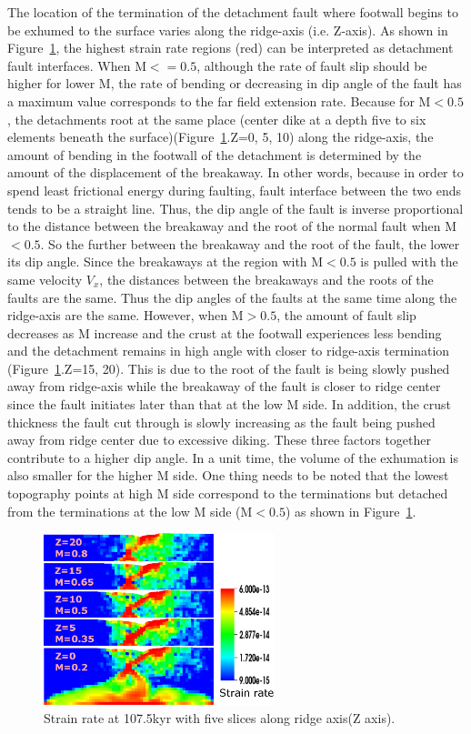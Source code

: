 The location of the termination of the detachment fault where footwall begins to be exhumed to the surface varies along the ridge-axis (i.e. Z-axis). As shown in Figure~\ref{fig_Results1_2}, the highest strain rate regions (red) can be interpreted as detachment fault interfaces. When M$<=0.5$, although the rate of fault slip should be higher for lower M, the rate of bending or decreasing in dip angle of the fault has a maximum value corresponds to the far field extension rate. Because for M$<0.5$, the detachments root at the same place (center dike at a depth five to six elements beneath the surface)(Figure~\ref{fig_Results1_2}.Z=0, 5, 10) along the ridge-axis, the amount of bending in the footwall of the detachment is determined by the amount of the displacement of the breakaway. In other words, because in order to spend least frictional energy during faulting, fault interface between the two ends tends to be a straight line. Thus, the dip angle of the fault is inverse proportional to the distance between the breakaway and the root of the normal fault when M$<0.5$. So the further between the breakaway and the root of the fault, the lower its dip angle. Since the breakaways at the region with M$<0.5$ is pulled with the same velocity $V_{x}$, the distances between the breakaways and the roots of the faults are the same. Thus the dip angles of the faults at the same time along the ridge-axis are the same. However, when M$>0.5$, the amount of fault slip decreases as M increase and the crust at the footwall experiences less bending and the detachment remains in high angle with closer to ridge-axis termination (Figure~\ref{fig_Results1_2}.Z=15, 20). This is due to the root of the fault is being slowly pushed away from ridge-axis while the breakaway of the fault is closer to ridge center since the fault initiates later than that at the low M side. In addition, the crust thickness the fault cut through is slowly increasing as the fault being pushed away from ridge center due to excessive diking. These three factors together contribute to a higher dip angle. In a unit time, the volume of the exhumation is also smaller for the higher M side. One thing needs to be noted that the lowest topography points at high M side correspond to the terminations but detached from the terminations at the low M side (M$<0.5$) as shown in Figure~\ref{fig_Results1_2}.        

\begin{figure}[hc]
  \centering
    \includegraphics[width=0.6\textwidth]{fig_Results1_2.eps}
  \caption{Strain rate at 107.5kyr with five slices along ridge axis(Z axis).}
 \label{fig_Results1_2}
\end{figure}   

